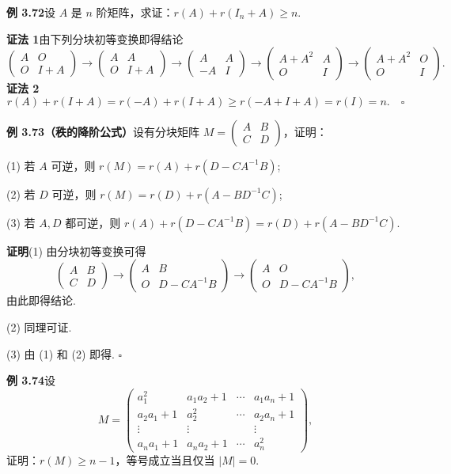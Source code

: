\documentclass[UTF8,12pt,a4paper,fontset=fandol]{ctexart}
\begin{document}
\noindent\textbf{例 3.72}\quad 设 $A$ 是 $n$ 阶矩阵，求证：$r(A)+r(I_n+A)\ge n$.

\noindent\textbf{证法 1}\quad 由下列分块初等变换即得结论
\[
\begin{pmatrix}A&O\\O&I+A\end{pmatrix}
\to
\begin{pmatrix}A&A\\O&I+A\end{pmatrix}
\to
\begin{pmatrix}A&A\\-A&I\end{pmatrix}
\to
\begin{pmatrix}A+A^2&A\\O&I\end{pmatrix}
\to
\begin{pmatrix}A+A^2&O\\O&I\end{pmatrix}.
\]
\noindent\textbf{证法 2}\quad
\[
r(A)+r(I+A)=r(-A)+r(I+A)\ge r(-A+I+A)=r(I)=n. \quad \square
\]

\noindent\textbf{例 3.73（秩的降阶公式）}\quad 设有分块矩阵 $M=\begin{pmatrix}A&B\\C&D\end{pmatrix}$，证明：

(1) 若 $A$ 可逆，则 $r(M)=r(A)+r(D-CA^{-1}B)$;

(2) 若 $D$ 可逆，则 $r(M)=r(D)+r(A-BD^{-1}C)$;

(3) 若 $A,D$ 都可逆，则 $r(A)+r(D-CA^{-1}B)=r(D)+r(A-BD^{-1}C)$.

\noindent\textbf{证明}\quad (1) 由分块初等变换可得
\[
\begin{pmatrix}A&B\\C&D\end{pmatrix}
\to
\begin{pmatrix}A&B\\O&D-CA^{-1}B\end{pmatrix}
\to
\begin{pmatrix}A&O\\O&D-CA^{-1}B\end{pmatrix},
\]
由此即得结论.

(2) 同理可证.

(3) 由 (1) 和 (2) 即得. $\square$

\noindent\textbf{例 3.74}\quad 设
\[
M=
\begin{pmatrix}
a_1^2 & a_1a_2+1 & \cdots & a_1a_n+1\\
a_2a_1+1 & a_2^2 & \cdots & a_2a_n+1\\
\vdots & \vdots &        & \vdots\\
a_na_1+1 & a_na_2+1 & \cdots & a_n^2
\end{pmatrix},
\]
证明：$r(M)\ge n-1$，等号成立当且仅当 $|M|=0$.
\end{document}

